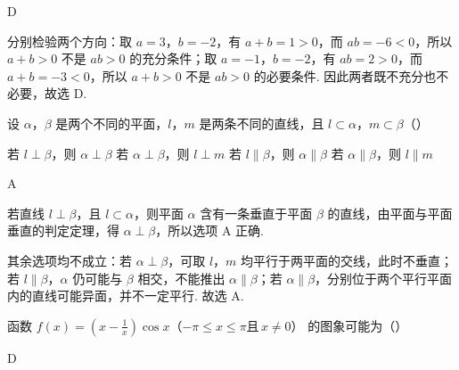 \begin{answer}
D
\end{answer}

\begin{solution}
分别检验两个方向：取 \(a=3\)，\(b=-2\)，有 \(a+b=1>0\)，而 \(ab=-6<0\)，所以 \(a+b>0\) 不是 \(ab>0\) 的充分条件；取 \(a=-1\)，\(b=-2\)，有 \(ab=2>0\)，而 \(a+b=-3<0\)，所以 \(a+b>0\) 不是 \(ab>0\) 的必要条件. 因此两者既不充分也不必要，故选 D.
\end{solution}

\begin{problem}
设 \(\alpha\)，\(\beta\) 是两个不同的平面，\(l\)，\(m\) 是两条不同的直线，且 \(l\subset\alpha\)，\(m\subset\beta\)（\quad）

\choices
    {若 \(l\perp\beta\)，则 \(\alpha\perp\beta\)}
    {若 \(\alpha\perp\beta\)，则 \(l\perp m\)}
    {若 \(l\parallel\beta\)，则 \(\alpha\parallel\beta\)}
    {若 \(\alpha\parallel\beta\)，则 \(l\parallel m\)}
\end{problem}

\begin{answer}
A
\end{answer}

\begin{solution}
若直线 \(l\perp\beta\)，且 \(l\subset\alpha\)，则平面 \(\alpha\) 含有一条垂直于平面 \(\beta\) 的直线，由平面与平面垂直的判定定理，得 \(\alpha\perp\beta\)，所以选项 A 正确.

其余选项均不成立：若 \(\alpha\perp\beta\)，可取 \(l\)，\(m\) 均平行于两平面的交线，此时不垂直；若 \(l\parallel\beta\)，\(\alpha\) 仍可能与 \(\beta\) 相交，不能推出 \(\alpha\parallel\beta\)；若 \(\alpha\parallel\beta\)，分别位于两个平行平面内的直线可能异面，并不一定平行. 故选 A.
\end{solution}

\begin{problem}
函数 \(f(x)=\left(x-\frac{1}{x}\right)\cos x\)（\(-\pi\leqslant x\leqslant \pi\text{且}\,x\neq0\)） 的图象可能为（\quad）

    {}
    {}
    {}
\end{problem}

\begin{answer}
D
\end{answer}

